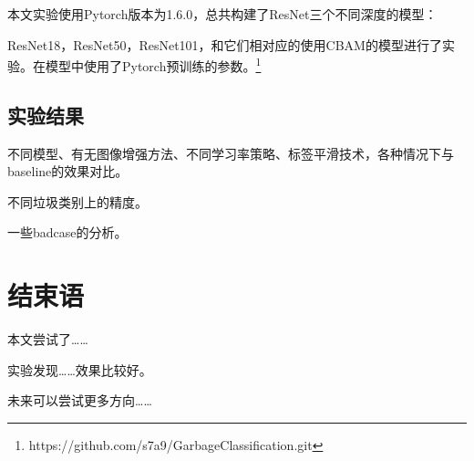\documentclass[a4paper]{article}
\begin{document}
\begin{CJK*}{UTF8}{gbsn}
本文实验使用Pytorch版本为1.6.0，总共构建了ResNet三个不同深度的模型：

ResNet18，ResNet50，ResNet101，和它们相对应的使用CBAM的模型进行了实验。在模型中使用了Pytorch预训练的参数。\footnote{https://github.com/s7a9/GarbageClassification.git}

\subsection{实验结果}
不同模型、有无图像增强方法、不同学习率策略、标签平滑技术，各种情况下与baseline的效果对比。

不同垃圾类别上的精度。

一些badcase的分析。
\section{结束语}
本文尝试了……

实验发现……效果比较好。

未来可以尝试更多方向……




\end{CJK*}
\end{document}
